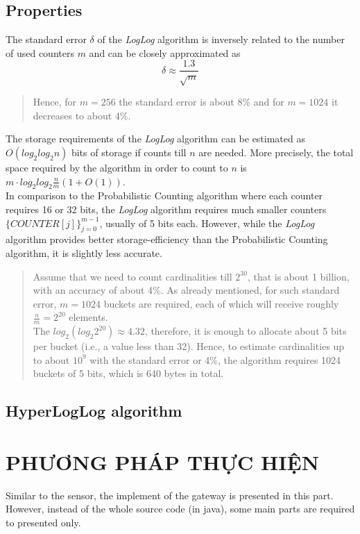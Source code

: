 \documentclass[a4paper,13pt]{article}
\theoremstyle{mytheor}
\begin{document}
\subsection*{Properties}
The standard error $\delta$ of the \textit{LogLog} algorithm is inversely related to
the number of used counters $m$ and can be closely approximated as
\[\delta \approx \frac{1.3}{\sqrt{m}}\]
\vspace{0.25cm}
\begin{quote}
    Hence, for $m = 256$ the standard error is about 8\% and for $m = 1024$ it
    decreases to about 4\%.
    \vspace{0.25cm}
\end{quote}
\vspace{0.25cm}
\indent The storage requirements of the \textit{LogLog} algorithm can be estimated as
$O(log_2log_2n)$ bits of storage if counts till $n$ are needed. More precisely,
the total space required by the algorithm in order to count to $n$ is
$m\cdot log_2log_2\frac{n}{m}(1 + O(1))$.\\
\indent In comparison to the Probabilistic Counting algorithm where each
counter requires 16 or 32 bits, the \textit{LogLog} algorithm requires much
smaller counters $\{COUNTER[j]\}_{j=0}^{m-1}$, usually of 5 bits each. However,
while the \textit{LogLog} algorithm provides better storage-efficiency than
the Probabilistic Counting algorithm, it is slightly less accurate.\\

\begin{quote}
    Assume that we need to count cardinalities till $2^30$, that is about 1 billion,
    with an accuracy of about 4\%. As already mentioned, for such standard
    error, $m = 1024$ buckets are required, each of which will receive roughly
    $\frac{n}{m} = 2^{20}$ elements.\\
    The $log_2\left(log_{2}2^{20}\right) \approx 4.32$, therefore, it is enough to allocate about 5 bits
    per bucket (i.e., a value less than 32). Hence, to estimate cardinalities up
    to about $10^9$ with the standard error or 4\%, the algorithm requires 1024
    buckets of 5 bits, which is 640 bytes in total.
    \vspace{0.25cm}
\end{quote}
\vspace{0.25cm}
\subsection*{HyperLogLog algorithm}
\section{PHƯƠNG PHÁP THỰC HIỆN }
Similar to the sensor, the implement of the gateway is presented in this part. However, instead of the whole source code (in java), some main parts are required to presented only.
\end{document}
